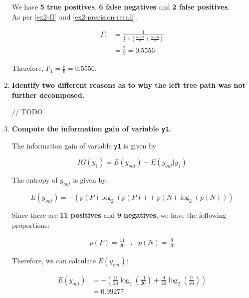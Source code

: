 \documentclass[12pt]{article}
\begin{document}
\begin{enumerate}[leftmargin=\labelsep]
          We have \textbf{5 true positives}, \textbf{6 false negatives} and \textbf{2 false positives}.\\
          As per \eqref{ex2-f1} and \eqref{ex2-precision-recall},

          \[
              \begin{aligned}
                  F_1 & = \frac{1}{\frac{1}{2} \times \left(\frac{5 + 2}{5} + \frac{5 + 6}{5}\right)} \\
                      & = \frac{5}{9} = 0.5556
              \end{aligned}
          \]

          Therefore, \(F_1 = \frac{5}{9} = 0.5556\).

    \item \textbf{Identify two different reasons as to why the left tree path was not further decomposed.}

          // TODO

    \item \textbf{Compute the information gain of variable \texttt{y1}.}

          The information gain of variable \texttt{y1} is given by

          \begin{equation}\label{ex4-ig}
              IG(y_1) = E(y_{out}) - E(y_{out} | y_1)
          \end{equation}

          The entropy of \(y_{out}\) is given by:

          \[
              E(y_{out}) = - \left(p(P) \log_2 \left(p(P)\right) + p(N) \log_2 \left(p(N)\right)\right)
          \]

          Since there are \textbf{11 positives} and \textbf{9 negatives}, we have the following proportions:

          \[
              \begin{array}{lcr}
                  p(P) = \frac{11}{20} & , & p(N) = \frac{9}{20}
              \end{array}
          \]

          Therefore, we can calculate $E(y_{out})$:

          \[
              \begin{aligned}
                  E(y_{out}) & = - \left(\frac{11}{20} \log_2\left(\frac{11}{20}\right) + \frac{9}{20} \log_2\left(\frac{9}{20}\right)\right) \\
                             & = 0.99277
              \end{aligned}
          \]


\end{enumerate}
\end{document}
